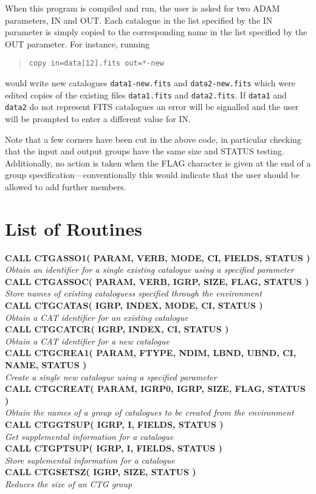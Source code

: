 \documentclass[twoside,11pt]{article}
\newenvironment{latexonly}{}{}
\renewcommand{\_}{\texttt{\symbol{95}}}
\newcommand{\noteroutine}[2]{{\small \bf #1} \\
                              \hspace*{3em} {\em #2} \\[1.5ex]}
\newcommand{\noteroutine}[2]{
      \begin{description}
         \item [{\bf {#1}}] {\em #2}
      \end{description}
   }
\newcommand{\latexonlysection}[1]{\section{#1}}
\newcommand{\latexonlysection}[1]{#1}
\begin{document}
When this program is compiled and run, the user is asked for 
two ADAM parameters, IN and OUT.  Each catalogue in the list specified
by the IN parameter is simply copied to the corresponding name in the 
list specified by the OUT parameter.  For instance, running
\begin{quote}
\latexonly{\small}
\begin{verbatim}
copy in=data[12].fits out=*-new
\end{verbatim}
\end{quote}
would write new catalogues {\tt data1-new.fits} and {\tt data2-new.fits}
which were edited copies of the existing files {\tt data1.fits} and
{\tt data2.fits}.
If {\tt data1} and {\tt data2} do not represent FITS catalogues
an error will be signalled and the user will be prompted to enter
a different value for IN.

Note that a few corners have been cut in the above code, in particular
checking that the input and output groups have the same size and
STATUS testing.  Additionally, no action is taken when the FLAG
character is given at the end of a group 
specification---conventionally this would indicate that the user
should be allowed to add further members.

\appendix

\begin{latexonly}
\latexonlysection{List of Routines}

\noteroutine{
      CALL CTG\_ASSO1( PARAM, VERB, MODE, CI, FIELDS, STATUS )
}{
   Obtain an identifier for a single existing catalogue using a specified
   parameter
}
\noteroutine{
      CALL CTG\_ASSOC( PARAM, VERB, IGRP, SIZE, FLAG, STATUS )
}{
   Store names of existing cataloguess specified through the environment
}
\noteroutine{
      CALL CTG\_CATAS( IGRP, INDEX, MODE, CI, STATUS )
}{
   Obtain a CAT identifier for an existing catalogue
}
\noteroutine{
      CALL CTG\_CATCR( IGRP, INDEX, CI, STATUS )
}{
   Obtain a CAT identifier for a new catalogue
}
\noteroutine{
      CALL CTG\_CREA1( PARAM, FTYPE, NDIM, LBND, UBND, CI, NAME,
                      STATUS )
}{
   Create a single new catalogue using a specified parameter
}
\noteroutine{
      CALL CTG\_CREAT( PARAM, IGRP0, IGRP, SIZE, FLAG, STATUS )
}{
   Obtain the names of a group of catalogues to be created from the
   environment
}
\noteroutine{
      CALL CTG\_GTSUP( IGRP, I, FIELDS, STATUS )
}{
   Get supplemental information for a catalogue
}
\noteroutine{
      CALL CTG\_PTSUP( IGRP, I, FIELDS, STATUS )
}{
   Store suplemental information for a catalogue
}
\noteroutine{
      CALL CTG\_SETSZ( IGRP, SIZE, STATUS )
}{
   Reduces the size of an CTG group
}

\end{latexonly}
\end{document}

